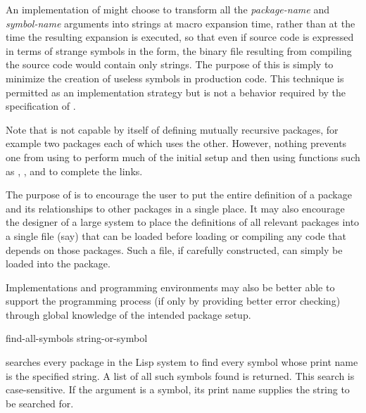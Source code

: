 \begin{new}
\begin{defmac}
\beforenoterule
\begin{implementation}
An implementation of  might choose to transform
all the \emph{package-name} and \emph{symbol-name} arguments
into strings at macro expansion time, rather than at the time
the resulting expansion is executed, so that even if source code
is expressed in terms of strange symbols in the  form,
the binary file resulting from compiling the source code would
contain only strings.  The purpose of this is simply to minimize
the creation of useless symbols in production code.  This technique
is permitted as an implementation strategy but is not a
behavior required by the specification of .
\end{implementation}
\afternoterule

Note that  is not capable by itself of defining
mutually recursive packages, for example two packages each of
which uses the other.  However, nothing prevents one from using
 to perform much of the initial setup and then
using functions such as , , and 
to complete the links.

The purpose of  is to encourage the user to
put the entire definition of a package and its relationships to
other packages in a single place.  It may also encourage the designer
of a large system to place the definitions of all relevant packages
into a single file (say) that can be loaded before loading or compiling
any code that depends on those packages.  Such a file, if carefully
constructed, can simply be loaded into the  package.

Implementations and programming environments may also be better able
to support the programming process (if only by providing better
error checking) through global knowledge of the intended package setup.
\end{defmac}
\end{new}

\begin{defun}[Function]
find-all-symbols string-or-symbol

searches every package in the Lisp system to find
every symbol whose print name is the
specified string.  A list of all such symbols found is returned.
This search is case-sensitive.
If the argument is a symbol, its print name supplies
the string to be searched for.
\end{defun}

